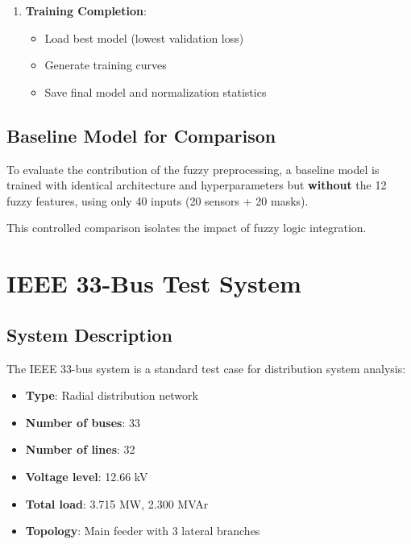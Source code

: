 \documentclass[12pt,a4paper]{report}
\begin{document}
\begin{enumerate}
\begin{enumerate}
        \item \textit{Checkpointing}:
        \begin{itemize}
            \item If validation loss improved: save model
            \item Update learning rate scheduler
            \item Check early stopping criterion
        \end{itemize}
    \end{enumerate}
    
    \item \textbf{Training Completion}:
    \begin{itemize}
        \item Load best model (lowest validation loss)
        \item Generate training curves
        \item Save final model and normalization statistics
    \end{itemize}
\end{enumerate}

\subsection{Baseline Model for Comparison}

To evaluate the contribution of the fuzzy preprocessing, a baseline model is trained with identical architecture and hyperparameters but \textbf{without} the 12 fuzzy features, using only 40 inputs (20 sensors + 20 masks).

This controlled comparison isolates the impact of fuzzy logic integration.

\section{IEEE 33-Bus Test System}

\subsection{System Description}

The IEEE 33-bus system is a standard test case for distribution system analysis:
\begin{itemize}
    \item \textbf{Type}: Radial distribution network
    \item \textbf{Number of buses}: 33
    \item \textbf{Number of lines}: 32
    \item \textbf{Voltage level}: 12.66 kV
    \item \textbf{Total load}: 3.715 MW, 2.300 MVAr
    \item \textbf{Topology}: Main feeder with 3 lateral branches
\end{itemize}
\end{document}
